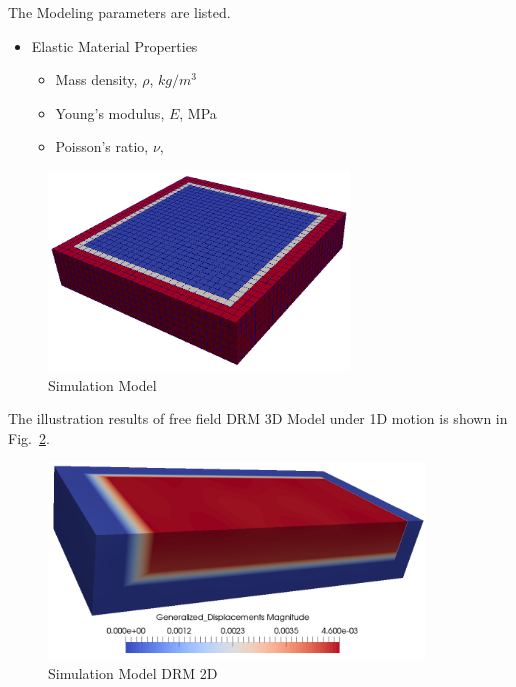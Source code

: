 The Modeling parameters are listed.
\begin{itemize}
  \item Elastic Material Properties 
  \begin{itemize}
    \item Mass density, $\rho$, \enspace {} $kg/m^3$
    \item Young's modulus, $E$, \enspace {} MPa
    \item Poisson's ratio, $\nu$, \enspace {}
  \end{itemize}
\end{itemize}


\begin{figure}[H]
  \centering
  \includegraphics[width = 8cm]{./Figure-files/Day2/Deconvolution_1D_Motions/Free_fields_3D_model_with_DRM/overview.png}
  \caption{Simulation Model}
  \label{fig_decon_1D_motion_3D_model1}
\end{figure}


The illustration results of free field DRM 3D Model under 1D motion is shown 
in Fig.~\ref{fig_day2_DRM3D_results}. 

\begin{figure}[H]
  \centering
  \includegraphics[width = 10cm]{./Figure-files/Day1/Preprocess_examples_with_Gmsh/example4/DRM3D_results.png}
  \caption{Simulation Model DRM 2D}
  \label{fig_day2_DRM3D_results}
\end{figure}



